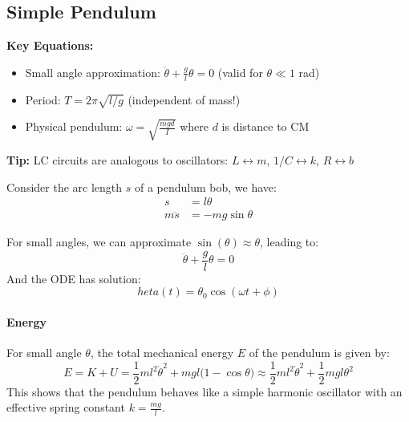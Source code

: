 \documentclass[11pt]{report}
\begin{document}
\subsection{Simple Pendulum}

\begin{keybox}
\textbf{Key Equations:}
\begin{itemize}
    \item Small angle approximation: $\ddot{\theta} + \frac{g}{l}\theta = 0$ (valid for $\theta \ll 1$ rad)
    \item Period: $T = 2\pi\sqrt{l/g}$ (independent of mass!)
    \item Physical pendulum: $\omega = \sqrt{\frac{mgd}{I}}$ where $d$ is distance to CM
\end{itemize}
\textbf{Tip:} LC circuits are analogous to oscillators: $L \leftrightarrow m$, $1/C \leftrightarrow k$, $R \leftrightarrow b$
\end{keybox}

Consider the arc length \( s \) of a pendulum bob, we have:
\begin{equation}\label{eq:pendulum_arc}
\begin{aligned}
    s &= l\theta \\
    m\ddot{s} &= -mg\sin\theta
\end{aligned}
\end{equation}

For small angles, we can approximate \( \sin(\theta) \approx \theta \), leading to:
\begin{equation}\label{eq:pendulum_small}
    \ddot{\theta} + \frac{g}{l}\theta = 0
\end{equation}
And the ODE has solution:
\begin{equation}\label{eq:pendulum_solution}
    	heta(t) = \theta_0 \cos(\omega t + \phi)
\end{equation}

\paragraph{Energy} For small angle $\theta$, the total mechanical energy \( E \) of the pendulum is given by:
\begin{equation}\label{eq:pendulum_energy}
    E = K + U = \frac{1}{2}ml^2\dot{\theta}^2 + mgl\big(1 - \cos\theta\big) \approx \frac{1}{2}ml^2\dot{\theta}^2 + \frac{1}{2}mgl\theta^2
\end{equation}
This shows that the pendulum behaves like a simple harmonic oscillator with an effective spring constant \( k = \frac{mg}{l} \).    
\end{document}
